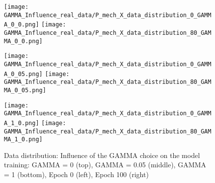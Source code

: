 \begin{figure}[H]
  \centering
  \texttt{[image: GAMMA\_Influence\_real\_data/P\_mech\_X\_data\_distribution\_0\_GAMMA\_0\_0.png]}
  \hspace{.4cm}
  \texttt{[image: GAMMA\_Influence\_real\_data/P\_mech\_X\_data\_distribution\_80\_GAMMA\_0\_0.png]}

  \vspace{.1cm}

  \texttt{[image: GAMMA\_Influence\_real\_data/P\_mech\_X\_data\_distribution\_0\_GAMMA\_0\_05.png]}
  \hspace{.4cm}
  \texttt{[image: GAMMA\_Influence\_real\_data/P\_mech\_X\_data\_distribution\_80\_GAMMA\_0\_05.png]}

  \vspace{.1cm}

  \texttt{[image: GAMMA\_Influence\_real\_data/P\_mech\_X\_data\_distribution\_0\_GAMMA\_1\_0.png]}
  \hspace{.4cm}
  \texttt{[image: GAMMA\_Influence\_real\_data/P\_mech\_X\_data\_distribution\_80\_GAMMA\_1\_0.png]}

  \vspace{.1cm}

  \caption{Data  distribution:  Influence of the GAMMA choice on the model training:  GAMMA  =  0  (top), GAMMA = 0.05 (middle), GAMMA = 1 (bottom), Epoch 0 (left), Epoch 100 (right)}
  \label{fig:distribution_GAMMA_influence_real_data}
\end{figure}


